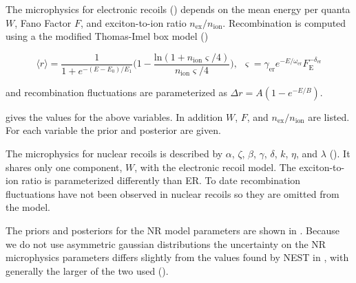 The microphysics for electronic recoils () depends on the mean energy
per quanta $W$, Fano Factor $F$, and exciton-to-ion ratio $n_{\mathrm{ex}} / n_{\mathrm{ion}}$.  Recombination is computed using
a the modified Thomas-Imel box model ()

\begin{equation}
\langle r \rangle = \frac{1}{1 + e^{-(E - E_0) / E_1}}
\bigg( 1 - \frac{\mathrm{ln}(1 + n_{\mathrm{ion}} \varsigma / 4)}{n_{\mathrm{ion}} \varsigma / 4} \bigg)
,\ \ \varsigma = \gamma_{\mathrm{er}} e^{-E / \omega_{\mathrm{er}}} F_{\mathrm{E}}^{-\delta_{\mathrm{er}}}
\end{equation}

\noindent and recombination fluctuations are parameterized as $\Delta r = A (1 - e^{-E / B})$.

 gives the values for the above variables.  In addition $W$, $F$, and
$n_{\mathrm{ex}} / n_{\mathrm{ion}}$ are listed.  For each variable the prior and
posterior are given.

The microphysics for nuclear recoils is described by $\alpha$, $\zeta$, $\beta$, $\gamma$, $\delta$, $k$, $\eta$, and $\lambda$
().  It shares only one
component, $W$, with the electronic recoil model.  The exciton-to-ion ratio is parameterized differently than ER.  To date
recombination fluctuations have not been observed in nuclear recoils so they are omitted from the model.

The priors and posteriors for the NR model parameters are shown in .  Because we
do not use asymmetric gaussian distributions the uncertainty on the NR microphysics parameters differs slightly from the values
found by NEST in , with generally the larger of the two used
().

